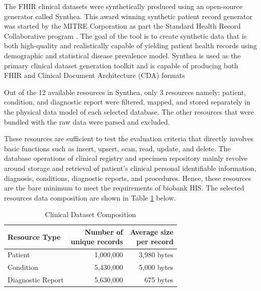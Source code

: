 \documentclass[5p]{elsarticle}
\begin{document}
The FHIR clinical datasets were synthetically produced using an open-source generator called Synthea. 
This award winning \cite{HealthDataManagement2017} synthetic patient record generator was started by the MITRE Corporation as
part the Standard Health Record Collaborative program \cite{J.Walonoski2018230}. 
The goal of the tool is to create synthetic data that is both high-quality and realistically capable of yielding patient health records using demographic and statistical disease prevalence model. 
Synthea is used as the primary clinical dataset generation toolkit \cite{J.C.M2016899} and is capable of producing both FHIR and Clinical Document Architecture (CDA) formats \cite{J.Walonoski2018230}


Out of the 12 available resources in Synthea, only 3 resources namely: patient, condition, and diagnostic report were filtered, mapped,
and stored separately in the physical data model of each selected database. 
The other resources that were bundled with the raw data were parsed and excluded. 

These resources are sufficient to test the evaluation criteria that directly involves basic functions such as insert, upsert, scan, read, update, and delete. 
The database operations of clinical registry and specimen repository mainly revolve around storage and retrieval of patient’s clinical personal identifiable information,
diagnosis, conditions, diagnostic reports, and procedures. Hence, these resources are the bare minimum to meet the requirements of biobank HIS.
The selected resources data composition are shown in Table \ref{table.dataset.composition} below.


\begin{table}[!htp]
    \centering
    \caption[l]{Clinical Dataset Composition}
     \label{table.dataset.composition}
        \begin{tabular}{lrr}
        \toprule
        Resource Type & \makecell[c]{Number of \\unique records}& \makecell[c]{Average size \\per record} \\
        \hline
        Patient           & 1,000,000 & 3,980 bytes \\
        Condition         & 5,430,000 & 5,000 bytes \\
        Diagnostic Report & 5,630,000 & 675 bytes \\
        \hline
    \end{tabular}
\end{table}
\end{document}
